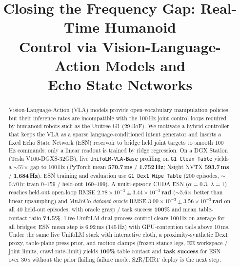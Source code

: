 \documentclass[conference]{IEEEtran}
\begin{document}
\title{Closing the Frequency Gap: Real-Time Humanoid\\
Control via Vision-Language-Action Models and\\
Echo State Networks}

\author{
\and
{}
}

\maketitle

\begin{abstract}
Vision-Language-Action (VLA) models provide open-vocabulary manipulation policies, but their inference rates are incompatible with the 100\,Hz joint control loops required by humanoid robots such as the Unitree G1 (29\,DoF).
We motivate a hybrid controller that keeps the VLA as a sparse language-conditioned intent generator and inserts a fixed Echo State Network (ESN) reservoir to bridge held joint targets to smooth 100\,Hz commands; only a linear readout is trained by ridge regression.
On a DGX Station (Tesla V100-DGXS-32GB), live \texttt{UnifoLM-VLA-Base} profiling on \texttt{G1\_Clean\_Table} yields a $\sim$57$\times$ gap to 100\,Hz (PyTorch mean \textbf{570.7\,ms} / \textbf{1.752\,Hz}; Nsight NVTX \textbf{593.7\,ms} / \textbf{1.684\,Hz}).
ESN training and evaluation use \texttt{G1\_Dex1\_Wipe\_Table} (200 episodes, $\sim$0.70\,h; train $0$--$159$ / held-out $160$--$199$).
A multi-episode CUDA ESN ($\alpha{=}0.3$, $\lambda{=}1$) reaches held-out open-loop RMSE \textbf{$2.78\times10^{-3}\!\pm\!3.44\times10^{-3}$\,rad} ($\sim$5.6$\times$ better than linear upsampling) and MuJoCo \emph{dataset-oracle} RMSE \textbf{$3.00\times10^{-3}\!\pm\!3.56\times10^{-3}$\,rad} on all 40 held-out episodes, with oracle grasp / task success \textbf{100\%} and mean table-contact ratio \textbf{74.5\%}.
Live UnifoLM dual-process control clears 100\,Hz on average for all bridges; ESN mean step is 6.92\,ms (145\,Hz) with GPU-contention tails above 10\,ms.
Under the same live UnifoLM stack with interactive cloth, a proximity-synthetic Dex1 proxy, table-plane press prior, and motion clamps (frozen stance legs, EE workspace / joint limits, crawl rate-limit) yields \textbf{100\%} table contact and \textbf{task success} for ESN over 30\,s without the prior flailing failure mode.
S2R/DIRT deploy is the next step.
\end{abstract}
\end{document}
